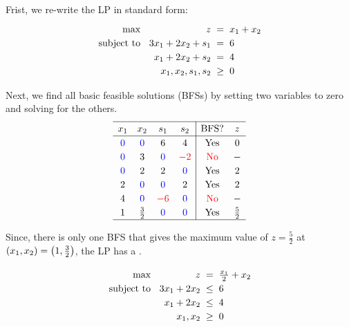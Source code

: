 \documentclass[a4paper, 10pt]{article}
\begin{document}
\begin{solution}
Frist, we re-write the LP in standard form:
\[
\begin{array}{@{\hspace{2mm}} r @{\hspace{2mm}} r @{\hspace{2mm}} c @{\hspace{2mm}} l}
    \text{max } & z & = & x_1 + x_2 \\
    \text{subject to } & 3x_1 + 2x_2 + s_1 & = & 6 \\
    & x_1 + 2x_2 + s_2 & = & 4 \\
    & x_1, x_2, s_1, s_2 & \geq & 0
\end{array}
\]

Next, we find all basic feasible solutions (BFSs) by setting two variables to zero and solving for the others.
\[
\renewcommand{\arraystretch}{1.2}
\begin{array}{cccc|cc}
    \hline
    x_1 & x_2 & s_1 & s_2 & \text{BFS}? & z \\
    \hline
    \textcolor[HTML]{0000FF}{0} & \textcolor[HTML]{0000FF}{0} & 6 & 4 & \text{Yes} & 0 \\
    \textcolor[HTML]{0000FF}{0} & 3 & \textcolor[HTML]{0000FF}{0} & \textcolor[HTML]{FF0000}{-2} & \textcolor[HTML]{FF0000}{\text{No}} & - \\
    \textcolor[HTML]{0000FF}{0} & 2 & 2 & \textcolor[HTML]{0000FF}{0} & \text{Yes} & 2 \\
    2 & \textcolor[HTML]{0000FF}{0} & \textcolor[HTML]{0000FF}{0} & 2 & \text{Yes} & 2 \\
    4 & \textcolor[HTML]{0000FF}{0} & \textcolor[HTML]{FF0000}{-6} & \textcolor[HTML]{0000FF}{0} & \textcolor[HTML]{FF0000}{\text{No}} & - \\
    1 & \frac{3}{2} & \textcolor[HTML]{0000FF}{0} & \textcolor[HTML]{0000FF}{0} & \text{Yes} & \frac{5}{2} \\
    \hline
\end{array}
\]

Since, there is only one BFS that gives the maximum value of \( z = \frac{5}{2} \) at \( (x_1, x_2) = \left( 1, \frac{3}{2} \right) \), the LP has a .
\end{solution}

\newpage

\begin{subproblems_alpha}[start=2]
    \item
    \[
    \begin{array}{@{\hspace{2mm}} r @{\hspace{2mm}} r @{\hspace{2mm}} c @{\hspace{2mm}} l}
        \text{max } & z & = & \frac{x_1}{2} + x_2 \\
        \text{subject to } & 3x_1 + 2x_2 & \leq & 6 \\
        & x_1 + 2x_2 & \leq & 4 \\
        & x_1, x_2 & \geq & 0
    \end{array}
    \]
\end{subproblems_alpha}
\end{document}
